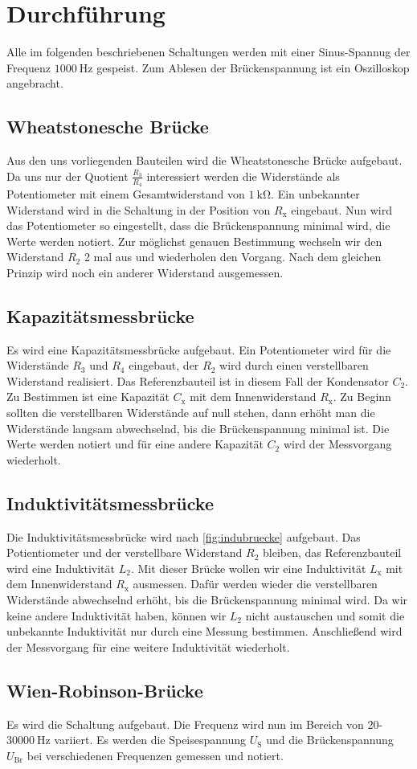\section{Durchführung}
\label{sec:Durchführung}
Alle im folgenden beschriebenen Schaltungen werden mit einer Sinus-Spannug der Frequenz $\SI{1000}{\hertz}$ gespeist.
Zum Ablesen der Brückenspannung ist ein Oszilloskop angebracht.
\subsection{Wheatstonesche Brücke}
Aus den uns vorliegenden Bauteilen wird die Wheatstonesche Brücke aufgebaut.
Da uns nur der Quotient $\frac{R_3}{R_4}$ interessiert werden die Widerstände als Potentiometer mit einem Gesamtwiderstand von $\SI{1}{\kilo\ohm}$.
Ein unbekannter Widerstand wird in die Schaltung in der Position von $ R_{\text{x}}$ eingebaut.
Nun wird das Potentiometer so eingestellt, dass die Brückenspannung minimal wird, die Werte werden notiert.
Zur möglichst genauen Bestimmung wechseln wir den Widerstand $R_2$ 2 mal aus und wiederholen den Vorgang.
Nach dem gleichen Prinzip wird noch ein anderer Widerstand ausgemessen.

\subsection{Kapazitätsmessbrücke}
Es wird eine Kapazitätsmessbrücke aufgebaut.
Ein Potentiometer wird für die Widerstände $R_3$ und $R_4$ eingebaut, der $R_2$ wird durch einen verstellbaren Widerstand realisiert.
Das Referenzbauteil ist in diesem Fall der Kondensator $C_2$. \\
Zu Bestimmen ist eine Kapazität $C_{\text{x}}$ mit dem Innenwiderstand $R_{\text{x}}$.
Zu Beginn sollten die verstellbaren Widerstände auf null stehen, dann erhöht man die Widerstände langsam abwechselnd, bis die Brückenspannung minimal ist.
Die Werte werden notiert und für eine andere Kapazität $C_2$ wird der Messvorgang wiederholt.

\subsection{Induktivitätsmessbrücke}
Die Induktivitätsmessbrücke wird nach \ref{fig:indubruecke} aufgebaut.
Das Potientiometer und der verstellbare Widerstand $R_2$ bleiben, das Referenzbauteil wird eine Induktivität $L_2$. 
Mit dieser Brücke wollen wir eine Induktivität $L_{\text{x}}$ mit dem Innenwiderstand $R_{\text{x}}$ ausmessen.
Dafür werden wieder die verstellbaren Widerstände abwechselnd erhöht, bis die Brückenspannung minimal wird.
Da wir keine andere Induktivität haben, können wir $L_2$ nicht austauschen und somit die unbekannte Induktivität nur durch eine Messung bestimmen.
Anschließend wird der Messvorgang für eine weitere Induktivität wiederholt.

\subsection{Wien-Robinson-Brücke}
Es wird die Schaltung aufgebaut.
Die Frequenz wird nun im Bereich von 20-$\SI{30000}{\hertz}$ variiert.
Es werden die Speisespannung $U_{\text{S}}$ und die Brückenspannung $U_{\text{Br}}$ bei verschiedenen Frequenzen gemessen und notiert.